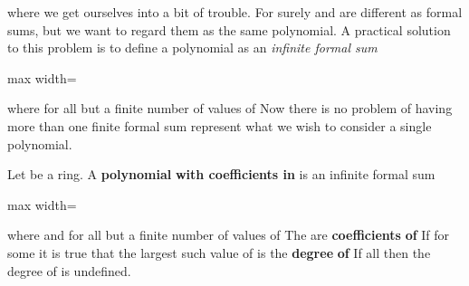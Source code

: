 \documentclass[11pt,oneside]{article}
\begin{document}
\BookNarrativetrue

\begin{BookBody}

\noindent where  we get ourselves into a bit of trouble. For surely  and   are different as formal sums, but we want to regard them as the same polynomial. A practical solution to this problem is to define a polynomial as an\textit{ infinite formal sum}

\begin{center}\begin{adjustbox}{max width=\linewidth}\end{adjustbox}\end{center}

\noindent where  for all but a finite number of values of  Now there is no problem of having more than one finite formal sum represent what we wish to consider a single polynomial.

 Let  be a ring. A\textbf{ polynomial}  \textbf{with coefficients in}  is an infinite formal sum

\begin{center}\begin{adjustbox}{max width=\linewidth}\end{adjustbox}\end{center}

\noindent where  and for all but a finite number of values of  The  are\textbf{ coefficients} \textbf{of}  If for some  it is true that  the largest such value of  is the\textbf{ degree} \textbf{of}  If all  then the degree of  is undefined.\label{bookfootnote:236:2:ref} \BookEnd{\blacksquare}


\end{BookBody}
\end{document}
